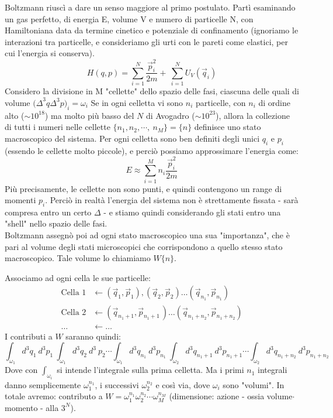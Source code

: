 \documentclass[12pt]{article}
\begin{document}
Boltzmann riuscì a dare un senso maggiore al primo postulato. Partì esaminando un gas perfetto, di energia E, volume V e numero di particelle N, con Hamiltoniana data da termine cinetico e potenziale di confinamento (ignoriamo le interazioni tra particelle, e consideriamo gli urti con le pareti come elastici, per cui l'energia si conserva).
\[
H\left(q,p\right)= \sum_{i=1}^{N}{\frac{{\vec{p}}_i^2}{2m}+\ \sum_{i=1}^{N}{U_V\left({\vec{q}}_i\right)}}
\]
Considero la divisione in M "cellette" dello spazio delle fasi, ciascuna delle quali di volume ${(\Delta}^3q \Delta^3p)_i=\omega_i$
Se in ogni celletta vi sono $n_i$ particelle, con $n_i$ di ordine alto ($\sim{10}^{18}$) ma molto più basso del $N$ di Avogadro ($\sim{10}^{23}$), allora la collezione di tutti i numeri nelle cellette $\{n_1,n_2,\cdots,\ n_M\}=\{n\}$ definisce uno stato macroscopico del sistema. 
Per ogni celletta sono ben definiti degli unici $q_i$ e $p_i$ (essendo le cellette molto piccole), e perciò possiamo approssimare l'energia come:
\[
E\approx\sum_{i=1}^{M}{n_i\frac{{\vec{p}}_i^2}{2m}}
\]
Più precisamente, le cellette non sono punti, e quindi contengono un range di momenti $p_i$. Perciò in realtà l'energia del sistema non è strettamente fissata - sarà compresa entro un certo $\Delta$ - e stiamo quindi considerando gli stati entro una "shell" nello spazio delle fasi.\\
Boltzmann assegnò poi ad ogni stato macroscopico una sua "importanza", che è pari al volume degli stati microscopici che corrispondono a quello stesso stato macroscopico. Tale volume lo chiamiamo $W\{n\}$.

Associamo ad ogni cella le sue particelle:
\begin{align*}
    \text{Cella 1} &\leftarrow\left({\vec{q}}_1,{\vec{p}}_1\right), \left({\vec{q}}_2,{\vec{p}}_2\right)\dots({\vec{q}}_{n_1},{\vec{p}}_{n_1})\\
    \text{Cella 2} & \leftarrow\left({\vec{q}}_{n_1+1},{\vec{p}}_{n_1+1\ }\right)\dots\left({\vec{q}}_{n_1+n_2},{\vec{p}}_{n_1+n_2}\right)\\
    \dots &\leftarrow \dots
\end{align*}
I contributi a $W$ saranno quindi:
\[
\int_{\omega_1}{d^3q_1\ d^3p_1\ \int_{\omega_1}{d^3q_2\ d^3\ p_2\cdots\int_{\omega_1}{d^3q_{n_1}\ d^3p_{n_1}\ \int_{\omega_2}{d^3q_{n_1+1}\ d^3p_{n_1+1}\cdots\int_{\omega_2}{d^3q_{n_1+n_2}\ d^3p_{n_1+n_2}}}\ }}}
\]
Dove con $\int_{\omega_i}$  si intende l'integrale sulla prima celletta. Ma i primi $n_1$ integrali danno semplicemente $\omega_1^{n_1}$, i successivi $\omega_2^{n_2}$ e così via, dove $\omega_i$ sono "volumi".
In totale avremo: contributo a $W= \omega_1^{n_1}\omega_2^{n_2}\cdots\omega_M^{n_M}$ (dimensione: azione - ossia volume$\cdot$momento - alla $3^N$).
\end{document}
